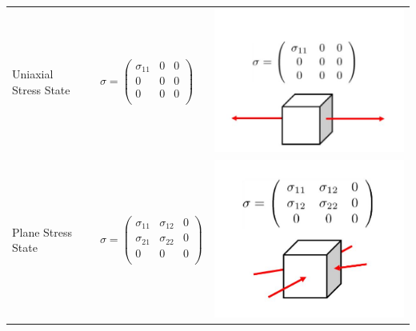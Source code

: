 \begin{tabularx}{\columnwidth}{llXX}
		Uniaxial Stress State & & 		$ \sigma = \begin{pmatrix} \sigma_{11} & 0 & 0\\ 0 & 0 & 0\\ 0 & 0 & 0\\ \end{pmatrix}$ &		\includegraphics[scale=.3]{images/3Dcfuniaxial}				\\
		Plane Stress State && $ \sigma = \begin{pmatrix} \sigma_{11} & \sigma_{12} & 0\\ \sigma_{21} & \sigma_{22} & 0\\ 0 & 0 & 0\\ \end{pmatrix}$&		\includegraphics[scale=.3]{images/3Dcfplanestress}				 \\

\end{tabularx}
